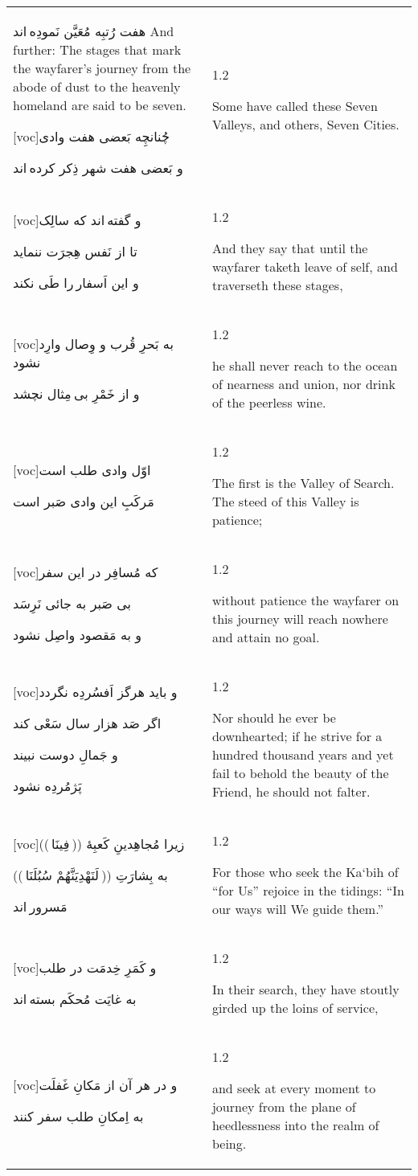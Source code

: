 \documentclass[11pt]{article}
\makeatletter
\newenvironment{orig}
  {\begin{farsi}[voc]}
  {\end{farsi}}
\newenvironment{trans}
  {\large\begin{spacing}{1.2}\raggedright}
  {\end{spacing}}
\newenvironment{word}
  {\begin{longtable}[t]{p{3in}@{\hspace{3em}}p{2.5in}}}
  {\end{longtable}}
\newcommand{\ayat}[2]{
  \begin{orig}#1\end{orig} &
  \vspace{1.5ex}\begin{trans}#2\end{trans} \vspace{-2ex}\\
}
\makeatother
\begin{document}
\begin{word}
{هفت رُتبِه مُعَيَّن نَمودِه اند}
     {And further: The stages that mark the wayfarer’s journey from the abode
      of dust to the heavenly homeland are said to be seven.}

\ayat{چُنانچِه بَعضی هفت وادی

و بَعضی هفت شهر ذِکر کرده اند}
     {Some have called these Seven Valleys, and others, Seven Cities.}

\ayat{و گفته اند که سالِک

تا از نَفس هِجرَت ننمايد

و اين اَسفار را طَی نکند}
     {And they say that until the wayfarer taketh leave of self, and
      traverseth these stages,}

\ayat{به بَحرِ قُرب و وِصال وارِد نشود

و از خَمْرِ بی مِثال نچشد}
     {he shall never reach to the ocean of nearness and union, nor drink of
      the peerless wine.}

\ayat{اوّل وادی طلب است

مَرکَبِ اين وادی صَبر است}
     {The first is the Valley of Search. The steed of this Valley is patience;}

\ayat{که مُسافِر در اين سفر

بی صَبر به جائی نَرِسَد

و به مَقصود واصِل نشود}
     {without patience the wayfarer on this journey will reach nowhere and
      attain no goal.}

\ayat{و بايد هرگز اَفسُردِه نگردد

اگر صَد هزار سال سَعْی کند

و جَمالِ دوست نبيند

پَژمُردِه نشود}
     {Nor should he ever be downhearted; if he strive for a hundred thousand
      years and yet fail to behold the beauty of the Friend, he should not
      falter.}

\ayat{زيرا مُجاهِدينِ کَعبِۀ (( فِينَا ))

به بِشارَتِ (( لَنَهْدِيَنَّهُمْ سُبُلَنَا ))

مَسرور اند}
     {For those who seek the Ka`bih of “for Us” rejoice in the tidings: “In
      our ways will We guide them.”}

\ayat{و کَمَرِ خِدمَت در طلب

به غايَت مُحکَم بسته اند}
     {In their search, they have stoutly girded up the loins of service,}

\ayat{و در هر آن از مَکانِ غَفلَت

به اِمکانِ طلب سفر کنند}
     {and seek at every moment to journey from the plane of heedlessness into
      the realm of being.}


\end{word}
\end{document}
